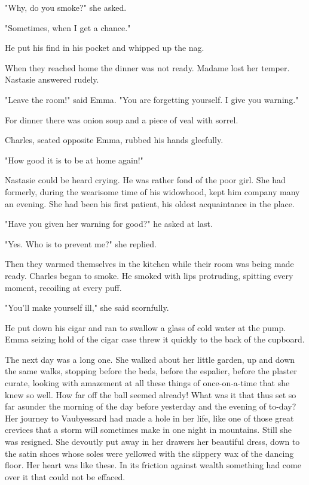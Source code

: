 \documentclass[11pt,twocolumn]{ltugboat}
\begin{document}
"Why, do you smoke?" she asked.

"Sometimes, when I get a chance."

He put his find in his pocket and whipped up the nag.

When they reached home the dinner was not ready. Madame lost her temper.
Nastasie answered rudely.

"Leave the room!" said Emma. "You are forgetting yourself. I give you
warning."

For dinner there was onion soup and a piece of veal with sorrel.

Charles, seated opposite Emma, rubbed his hands gleefully.

"How good it is to be at home again!"

Nastasie could be heard crying. He was rather fond of the poor girl.
She had formerly, during the wearisome time of his widowhood, kept him
company many an evening. She had been his first patient, his oldest
acquaintance in the place.

"Have you given her warning for good?" he asked at last.

"Yes. Who is to prevent me?" she replied.

Then they warmed themselves in the kitchen while their room was being
made ready. Charles began to smoke. He smoked with lips protruding,
spitting every moment, recoiling at every puff.

"You'll make yourself ill," she said scornfully.

He put down his cigar and ran to swallow a glass of cold water at the
pump. Emma seizing hold of the cigar case threw it quickly to the back
of the cupboard.

The next day was a long one. She walked about her little garden, up
and down the same walks, stopping before the beds, before the espalier,
before the plaster curate, looking with amazement at all these things
of once-on-a-time that she knew so well. How far off the ball seemed
already! What was it that thus set so far asunder the morning of the day
before yesterday and the evening of to-day? Her journey to Vaubyessard
had made a hole in her life, like one of those great crevices that
a storm will sometimes make in one night in mountains. Still she was
resigned. She devoutly put away in her drawers her beautiful dress, down
to the satin shoes whose soles were yellowed with the slippery wax of
the dancing floor. Her heart was like these. In its friction against
wealth something had come over it that could not be effaced.
\end{document}
